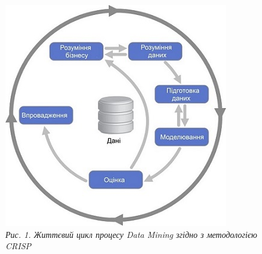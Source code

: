 \documentclass[
]{book}
\begin{document}
\begin{figure}
\centering
\includegraphics{image/CRISP_DM.jpg}
\caption{\emph{Рис. 1. Життєвий цикл процесу Data Mining згідно з методологією CRISP }}
\end{figure}
\end{document}
